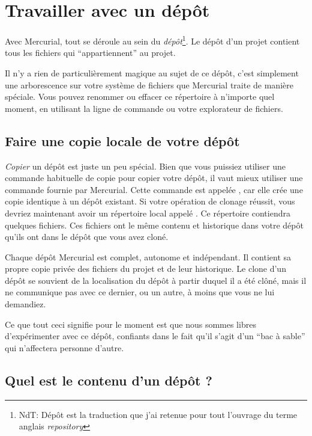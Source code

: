 \section{Travailler avec un dépôt}

Avec Mercurial, tout se déroule au sein du \emph{dépôt}\footnote{NdT: Dépôt est
la traduction que j'ai retenue pour tout l'ouvrage du terme anglais \textit{repository}}.
Le dépôt d'un projet contient tous les fichiers qui ``appartiennent'' au projet.

Il n'y a rien de particulièrement magique au sujet de ce dépôt, c'est
simplement une arborescence sur votre système de fichiers que Mercurial
traite de manière spéciale. Vous pouvez renommer ou effacer ce répertoire
à n'importe quel moment, en utilisant la ligne de commande ou votre
explorateur de fichiers.

\subsection{Faire une copie locale de votre dépôt}

\emph{Copier} un dépôt est juste un peu spécial. Bien que vous 
puissiez utiliser une commande habituelle de copie pour copier
votre dépôt, il vaut mieux utiliser une commande fournie par
Mercurial. Cette commande est appelée , car elle
crée une copie identique à un dépôt existant.
Si votre opération de clonage réussit, vous devriez maintenant
avoir un répertoire local appelé . Ce répertoire
contiendra quelques fichiers.
Ces fichiers ont le même contenu et historique dans votre dépôt
qu'ils ont dans le dépôt que vous avez cloné.

Chaque dépôt Mercurial est complet, autonome et indépendant. Il
contient sa propre copie privée des fichiers du projet et de leur
historique. Le clone d'un dépôt se souvient de la localisation du
dépôt à partir duquel il a été clôné, mais il ne communique pas avec
ce dernier, ou un autre, à moins que vous ne lui demandiez.

Ce que tout ceci signifie pour le moment est que nous sommes libres
d'expérimenter avec ce dépôt, confiants dans le fait qu'il s'agit d'un
``bac à sable'' qui n'affectera personne d'autre.

\subsection{Quel est le contenu d'un dépôt ?}

